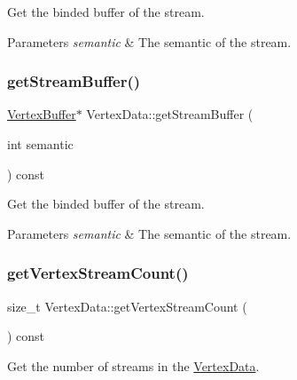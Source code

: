 Get the binded buffer of the stream. 
\begin{DoxyParams}{Parameters}
{\em semantic} & The semantic of the stream. \\
\hline
\end{DoxyParams}
\mbox{\label{classVertexData_ae9b78d5a039150804d83da739000ecd0}} 
\subsubsection{\texorpdfstring{get\+Stream\+Buffer()}{getStreamBuffer()}\hspace{0.1cm}{\footnotesize\ttfamily [2/2]}}
{\footnotesize\ttfamily \hyperlink{classVertexBuffer}{Vertex\+Buffer}$\ast$ Vertex\+Data\+::get\+Stream\+Buffer (\begin{DoxyParamCaption}\item[{int}]{semantic }\end{DoxyParamCaption}) const}

Get the binded buffer of the stream. 
\begin{DoxyParams}{Parameters}
{\em semantic} & The semantic of the stream. \\
\hline
\end{DoxyParams}
\mbox{\label{classVertexData_a33c6eaabfec301c9e45718ab27b5a1c5}} 
\subsubsection{\texorpdfstring{get\+Vertex\+Stream\+Count()}{getVertexStreamCount()}\hspace{0.1cm}{\footnotesize\ttfamily [1/2]}}
{\footnotesize\ttfamily size\+\_\+t Vertex\+Data\+::get\+Vertex\+Stream\+Count (\begin{DoxyParamCaption}{ }\end{DoxyParamCaption}) const}

Get the number of streams in the \hyperlink{classVertexData}{Vertex\+Data}. \mbox{\label{classVertexData_a33c6eaabfec301c9e45718ab27b5a1c5}} 
